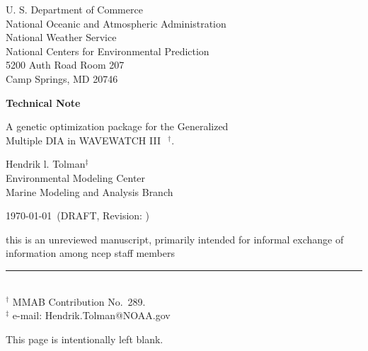 \documentclass[12pt]{article}
\newcommand{\pstyle}{myheadings}
\newcommand{\wwt}{WAVEWATCH III$\:$\textsuperscript\textregistered}
\newcommand{\bpage}{\vfill \pagebreak \strut

\vspace{2.5in} \centerline{This page is intentionally left blank.}}
\begin{document}

\pagestyle{empty}

\strut \vspace{5mm}

\begin{center} 
U. S. Department of Commerce \\
National Oceanic and Atmospheric Administration \\
National Weather Service \\
National Centers for Environmental Prediction \\
5200 Auth Road Room 207 \\
Camp Springs, MD 20746

\vspace{15mm}

{\bf Technical Note}

\vspace{15mm}

{\large A genetic optimization package for the Generalized \\ Multiple DIA in
  \wwt\ $^\dag$.}

\vspace{20mm}

Hendrik l. Tolman$^\ddag$
\\
Environmental Modeling Center \\
Marine Modeling and Analysis Branch

\vspace{25mm}

\today\ (DRAFT, Revision: \SVNRevision)

\vfill {\sc this is an unreviewed manuscript, primarily
intended for informal exchange of information among ncep staff
members}

\end{center}
\noindent \rule{140mm}{0.5mm} \\
{\small $^\dag$ MMAB Contribution No.~289. \\
$^\ddag$ e-mail: Hendrik.Tolman@NOAA.gov} \\

\bpage

\pagebreak

\pagestyle{\pstyle}
\setcounter{page}{1}
\end{document}
